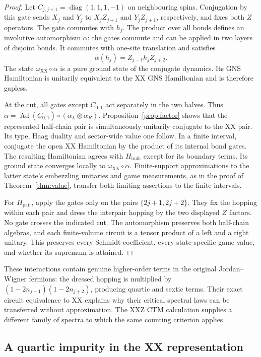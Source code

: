 \begin{proof}
Let $C_{j,j+1}=\operatorname{diag}(1,1,1,-1)$ on neighbouring spins.
Conjugation by this gate sends $X_j$ and $Y_j$ to $X_jZ_{j+1}$ and
$Y_jZ_{j+1}$, respectively, and fixes both $Z$ operators. The gate
commutes with $h_j$. The product over all bonds defines an involutive
automorphism $\alpha$: the gates commute and can be applied in two
layers of disjoint bonds. It commutes with one-site translation and
satisfies
\[
 \alpha(h_j)=Z_{j-1}h_jZ_{j+2}.
\]
The state $\omega_{\mathrm{XX}}\circ\alpha$ is a pure ground state
of the conjugate dynamics. Its GNS Hamiltonian is unitarily equivalent
to the XX GNS Hamiltonian and is therefore gapless.

At the cut, all gates except $C_{0,1}$ act separately in the two
halves. Thus $\alpha=\operatorname{Ad}(C_{0,1})\circ
(\alpha_L\otimes\alpha_R)$. Proposition~\ref{prop:factor} shows that
the represented half-chain pair is simultaneously unitarily conjugate
to the XX pair. Its type, Haag duality and sector-wide value one follow.
In a finite interval, conjugate the open XX Hamiltonian by the product
of its internal bond gates. The resulting Hamiltonian agrees with
$H_{\mathrm{bulk}}$ except for its boundary terms. Its ground state
converges locally to $\omega_{\mathrm{XX}}\circ\alpha$. Finite-support
approximations to the latter state's embezzling unitaries and game
measurements, as in the proof of Theorem~\ref{thm:value}, transfer both
limiting assertions to the finite intervals.

For $H_{\mathrm{pair}}$, apply the gates only on the pairs
$\{2j+1,2j+2\}$. They fix the hopping within each pair and dress the
interpair hopping by the two displayed $Z$ factors. No gate crosses
the indicated cut. The automorphism preserves both half-chain
algebras, and each finite-volume circuit is a tensor product of a
left and a right unitary. This preserves every Schmidt coefficient,
every state-specific game value, and whether its supremum is attained.
\end{proof}

These interactions contain genuine higher-order terms in the original
Jordan--Wigner fermions: the dressed hopping is multiplied by
$(1-2n_{j-1})(1-2n_{j+2})$, producing quartic and sextic terms.
Their exact circuit equivalence to XX explains why their critical
spectral laws can be transferred without approximation. The XXZ CTM
calculation supplies a different family of spectra to which the same
counting criterion applies.

\subsection{A quartic impurity in the XX representation}

